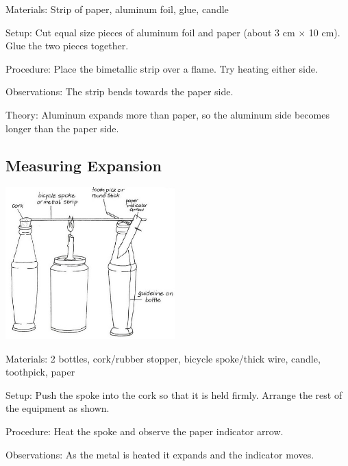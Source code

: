 \begin{multicols}{2}
\begin{description*}
\item[Materials:]{Strip of paper, aluminum foil, glue, candle}
\item[Setup:]{Cut equal size pieces of aluminum foil and paper (about 3 cm $\times$ 10 cm). Glue the two pieces together.}
\item[Procedure:]{Place the bimetallic strip over a flame. Try heating either side.}
\item[Observations:]{The strip bends towards the paper side.}
\item[Theory:]{Aluminum expands more than paper, so the aluminum side becomes longer than the paper side.}
\end{description*}

\subsection{Measuring Expansion}

\begin{center}
\includegraphics[width=0.49\textwidth]{./img/vso/measuring-expansion.jpg}
\end{center}

\begin{description*}
\item[Materials:]{2 bottles, cork/rubber stopper, bicycle spoke/thick wire, candle, toothpick, paper}
\item[Setup:]{Push the spoke into the cork so that it is held firmly. Arrange the rest of the equipment as shown.}
\item[Procedure:]{Heat the spoke and observe the paper indicator arrow.}
\item[Observations:]{As the metal is heated it expands and the indicator moves.}
\end{description*}


\end{multicols}
